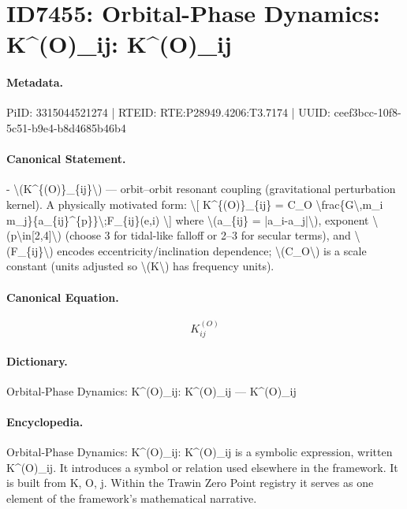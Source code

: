 \section*{ID7455: Orbital-Phase Dynamics: K\textasciicircum{}(O)\_ij: K\textasciicircum{}(O)\_ij}
\paragraph{Metadata.}
PiID: 3315044521274 | RTEID: RTE:P28949.4206:T3.7174 | UUID: ceef3bcc-10f8-5c51-b9e4-b8d4685b46b4

\paragraph{Canonical Statement.}
- \textbackslash{}(K\textasciicircum{}\{(O)\}\_\{ij\}\textbackslash{}) — orbit–orbit resonant coupling (gravitational perturbation kernel). A physically motivated form: \textbackslash{}[ K\textasciicircum{}\{(O)\}\_\{ij\} = C\_O \textbackslash{}frac\{G\textbackslash{},m\_i m\_j\}\{a\_\{ij\}\textasciicircum{}\{p\}\}\textbackslash{};F\_\{ij\}(e,i) \textbackslash{}] where \textbackslash{}(a\_\{ij\} = |a\_i-a\_j|\textbackslash{}), exponent \textbackslash{}(p\textbackslash{}in[2,4]\textbackslash{}) (choose 3 for tidal-like falloff or 2–3 for secular terms), and \textbackslash{}(F\_\{ij\}\textbackslash{}) encodes eccentricity/inclination dependence; \textbackslash{}(C\_O\textbackslash{}) is a scale constant (units adjusted so \textbackslash{}(K\textbackslash{}) has frequency units).

\paragraph{Canonical Equation.}
\[
K^{(O)}_{ij}
\]

\paragraph{Dictionary.}
Orbital-Phase Dynamics: K\textasciicircum{}(O)\_ij: K\textasciicircum{}(O)\_ij — K\textasciicircum{}(O)\_ij

\paragraph{Encyclopedia.}
Orbital-Phase Dynamics: K\textasciicircum{}(O)\_ij: K\textasciicircum{}(O)\_ij is a symbolic expression, written K\textasciicircum{}(O)\_ij. It introduces a symbol or relation used elsewhere in the framework. It is built from K, O, j. Within the Trawin Zero Point registry it serves as one element of the framework's mathematical narrative.
